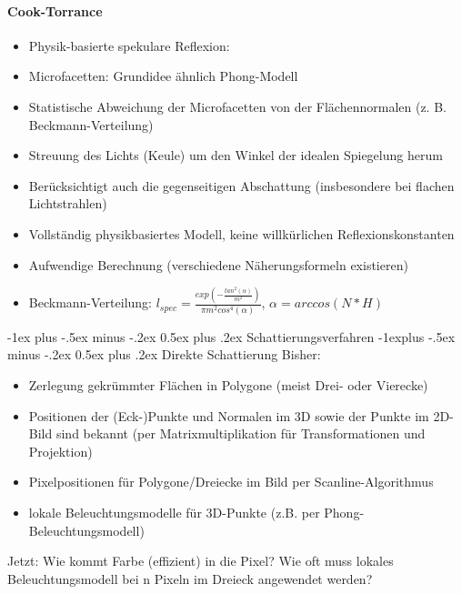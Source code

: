 \documentclass[10pt,landscape]{article}
\makeatletter
\renewcommand{\section}{\@startsection{section}{1}{0mm}%
                                {-1ex plus -.5ex minus -.2ex}%
                                {0.5ex plus .2ex}%
                                {\normalfont\large\bfseries}}
\renewcommand{\subsection}{\@startsection{subsection}{2}{0mm}%
                                {-1explus -.5ex minus -.2ex}%
                                {0.5ex plus .2ex}%
                                {\normalfont\normalsize\bfseries}}
\makeatother
\begin{document}
\begin{multicols}{3}
{  \paragraph{Cook-Torrance}
  \begin{itemize}
    \item Physik-basierte spekulare Reflexion:
    \item Microfacetten: Grundidee ähnlich Phong-Modell
    \item Statistische Abweichung der Microfacetten von der Flächennormalen (z. B. Beckmann-Verteilung)
    \item Streuung des Lichts (Keule) um den Winkel der idealen Spiegelung herum
    \item Berücksichtigt auch die gegenseitigen Abschattung (insbesondere bei flachen Lichtstrahlen)
    \item Vollständig physikbasiertes Modell, keine willkürlichen Reflexionskonstanten
    \item Aufwendige Berechnung (verschiedene Näherungsformeln existieren)
    \item Beckmann-Verteilung: $l_{spec}=\frac{exp(-\frac{tan^2(\alpha)}{m^2})}{\pi m^2 cos^4 (\alpha)}$, $\alpha=arccos(N*H)$
  \end{itemize}
  
  \section{Schattierungsverfahren}
  \subsection{ Direkte Schattierung}
  Bisher:
  \begin{itemize}
    \item Zerlegung gekrümmter Flächen in Polygone (meist Drei- oder Vierecke)
    \item Positionen der (Eck-)Punkte und Normalen im 3D sowie der Punkte im 2D-Bild sind bekannt (per Matrixmultiplikation für Transformationen und Projektion)
    \item Pixelpositionen für Polygone/Dreiecke im Bild per Scanline-Algorithmus
    \item lokale Beleuchtungsmodelle für 3D-Punkte (z.B. per Phong-Beleuchtungsmodell)
  \end{itemize}
  
  Jetzt: Wie kommt Farbe (effizient) in die Pixel? Wie oft muss lokales Beleuchtungsmodell bei n Pixeln im Dreieck angewendet werden?
  
}
\end{multicols}
\end{document}
